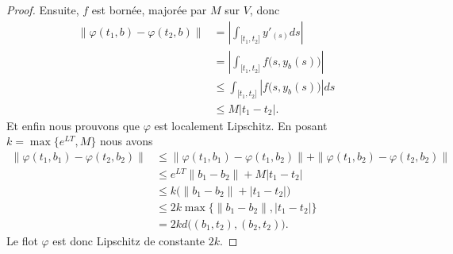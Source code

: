 \begin{proof}
	Ensuite, \( f\) est bornée, majorée par \( M\) sur $V$, donc
	\begin{subequations}
		\begin{align}
			\| \varphi(t_1,b)-\varphi(t_2,b) \| & =| \int_{\mathopen[ t_1 , t_2 \mathclose]} y'_(s)ds |                   \\
			                                    & =| \int_{\mathopen[ t_1 , t_2 \mathclose]}f\big( s,y_b(s) \big) |       \\
			                                    & \leq \int_{\mathopen[ t_1 , t_2 \mathclose]}| f\big( s,y_b(s) \big) |ds \\
			                                    & \leq M| t_1-t_2 |.
		\end{align}
	\end{subequations}
	Et enfin nous prouvons que \( \varphi\) est localement Lipschitz. En posant \( k=\max\{  e^{LT},M \}\) nous avons
	\begin{subequations}
		\begin{align}
			\| \varphi(t_1,b_1)-\varphi(t_2,b_2) \| & \leq \| \varphi(t_1,b_1)-\varphi(t_1,b_2) \|+\| \varphi(t_1,b_2)-\varphi(t_2,b_2) \| \\
			                                        & \leq  e^{LT}\| b_1-b_2 \|+M| t_1-t_2 |                                               \\
			                                        & \leq k\big( \| b_1-b_2 \|+| t_1-t_2 | \big)                                          \\
			                                        & \leq 2k\max\{ \| b_1-b_2 \|,| t_1-t_2 | \}                                           \\
			                                        & =2kd\big(  (b_1,t_2),(b_2,t_2)  \big).
		\end{align}
	\end{subequations}
	Le flot \( \varphi\) est donc Lipschitz de constante \( 2k\).
\end{proof}

